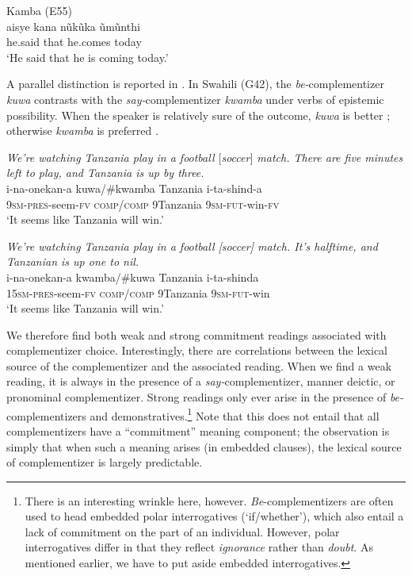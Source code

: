 \documentclass[output=paper,colorlinks,citecolor=brown,
]{langscibook}
\begin{document}
\ea\label{ex:gluckman:kana.kamba.evid} Kamba (E55) \citep[190]{Myers:1975} \\
	\gll aisye kana n\~uk\~uka \~um\~unthi\\
	he.said that he.comes today\\
	\glt `He said that he is coming today.' 
\z

A parallel distinction is reported in \citet{FinholtGluckman:2023}. In Swahili (G42), the \textit{be-}complementizer \textit{kuwa} contrasts with the \textit{say-}complementizer \textit{kwamba} under verbs of epistemic possibility. When the speaker is relatively sure of the outcome, \textit{kuwa} is better ; otherwise \textit{kwamba} is preferred .

\ea\label{ex:gluckman:kuwa.evid}
\textit{We’re watching Tanzania play in a football $[$soccer$]$ match. There are five minutes left to play, and Tanzania is up by three.} \\
\gll i-na-onekan-a kuwa/\#kwamba Tanzania i-ta-shind-a\\
9\textsc{sm-pres}-seem-\textsc{fv} \textsc{comp}/\textsc{comp} 9Tanzania 9\textsc{sm-fut}-win-\textsc{fv}\\
\glt `It seems like Tanzania will win.'
\z

\ea\label{ex:gluckman:kwamba.evid}
\textit{We’re watching Tanzania play in a football [soccer] match. It’s halftime, and Tanzanian is
up one to nil.} \\
\gll i-na-onekan-a kwamba/\#kuwa Tanzania i-ta-shinda\\
15\textsc{sm-pres}-seem-\textsc{fv} \textsc{comp/comp} 9Tanzania 9\textsc{sm-fut}-win\\
\glt `It seems like Tanzania will win.'
\z

We therefore find both weak and strong commitment readings associated with complementizer choice. Interestingly, there are correlations between the lexical source of the complementizer and the associated reading. When we find a weak reading, it is always in the presence of a \textit{say-}complementizer, manner deictic, or  pronominal complementizer. Strong readings only ever arise in the presence of \textit{be-}complementizers and demonstratives.\footnote{There is an interesting wrinkle here, however. \textit{Be}-complementizers are often used to head embedded polar interrogatives (`if/whether'), which also entail a lack of commitment on the part of an individual. However, polar interrogatives differ in that they reflect \textit{ignorance} rather than \textit{doubt}. As mentioned earlier, we have to put aside embedded interrogatives.} Note that this does not entail that all complementizers have a ``commitment'' meaning component; the observation is simply that when such a meaning arises (in embedded clauses), the lexical source of  complementizer is largely predictable. 
\end{document}
